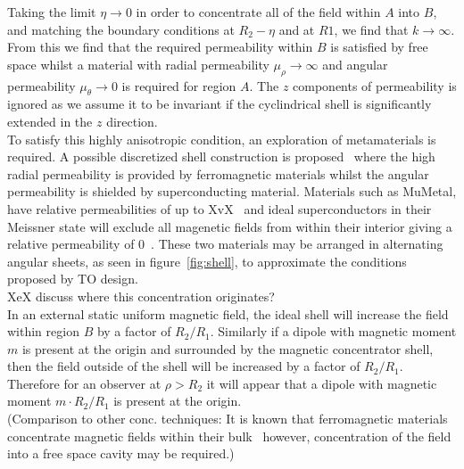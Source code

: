 \documentclass[11pt]{iopart}
\begin{document}
Taking the limit $\eta \rightarrow 0$ in order to concentrate all of
the field within $A$ into $B$, and matching the boundary conditions at
$R_2-\eta$ and at $R1$, we find that $k \rightarrow \infty$. From this
we find that the required permeability within $B$ is satisfied by free
space whilst a material with radial permeability $\mu_\rho \rightarrow
\infty$ and angular permeability $\mu_\theta \rightarrow 0$ is
required for region $A$. The $z$ components of permeability is ignored
as we assume it to be invariant if the cyclindrical shell is
significantly extended in the $z$ direction.\\
To satisfy this highly anisotropic condition, an exploration of
metamaterials is required. A possible discretized shell construction
is proposed~\cite{PRATT} where the high radial permeability is
provided by ferromagnetic materials whilst the angular permeability is
shielded by superconducting material. Materials such as MuMetal, have
relative permeabilities of up to XvX~\cite{MUMETAL} and ideal
superconductors in their Meissner state will exclude all magenetic
fields from within their interior giving a relative permeability of
$0$~\cite{Meissner}.  These two materials may be arranged in
alternating angular sheets, as seen in figure~\ref{fig:shell}, to
approximate the conditions proposed by TO design. \\
XeX discuss where this concentration originates? \\
In an external static uniform magnetic field, the ideal shell will
increase the field within region $B$ by a factor of
$R_2/R_1$. Similarly if a dipole with magnetic moment $m$ is present
at the origin and surrounded by the magnetic concentrator shell, then
the field outside of the shell will be increased by a factor of
$R_2/R_1$. Therefore for an observer at $\rho > R_2$ it will appear
that a dipole with magnetic moment $m\cdot R_2/R_1$ is present at the
origin.\\

(Comparison to other conc. techniques:
It is known that ferromagnetic materials concentrate magnetic fields
within their bulk~\cite{ferro} however, concentration of the field
into a free space cavity may be required.)
\end{document}
